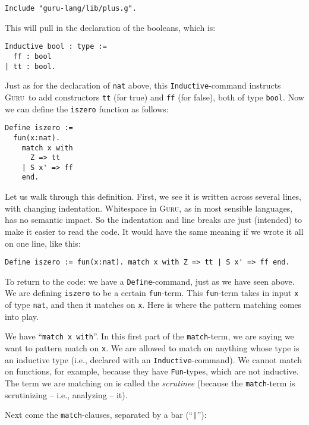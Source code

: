 \documentclass{book}[12pt]
\newcommand{\guru}[0]{\textsc{Guru}}
\begin{document}
\begin{verbatim}
Include "guru-lang/lib/plus.g".
\end{verbatim}

\noindent This will pull in the declaration of the booleans, which is:

\begin{verbatim}
Inductive bool : type :=
  ff : bool
| tt : bool.
\end{verbatim}

\noindent Just as for the declaration of \texttt{nat} above, this
\texttt{Inductive}-command instructs \guru\ to add constructors
\texttt{tt} (for true) and \texttt{ff} (for false), both of type
\texttt{bool}.  Now we can define the \texttt{iszero} function as
follows:

\begin{verbatim}
Define iszero := 
  fun(x:nat). 
    match x with 
      Z => tt 
    | S x' => ff
    end.
\end{verbatim}

\noindent Let us walk through this definition.  First, we see it is
written across several lines, with changing indentation.  Whitespace
in \guru, as in most sensible languages, has no semantic impact.  So
the indentation and line breaks are just (intended) to make it easier
to read the code.  It would have the same meaning if we wrote it all
on one line, like this:

\begin{verbatim}
Define iszero := fun(x:nat). match x with Z => tt | S x' => ff end.
\end{verbatim}

\noindent To return to the code: we have a \texttt{Define}-command,
just as we have seen above.  We are defining \texttt{iszero} to be a
certain \texttt{fun}-term.  This \texttt{fun}-term takes in input
\texttt{x} of type \texttt{nat}, and then it matches on \texttt{x}.
Here is where the pattern matching comes into play.  

We have ``\texttt{match x with}''.  In this first part of the
\texttt{match}-term, we are saying we want to pattern match on
\texttt{x}.  We are allowed to match on anything whose type is an
inductive type (i.e., declared with an \texttt{Inductive}-command).
We cannot match on functions, for example, because they have
\texttt{Fun}-types, which are not inductive.  The term we are matching
on is called the \emph{scrutinee} (because the \texttt{match}-term is
scrutinizing -- i.e., analyzing -- it).  

Next come the \texttt{match}-clauses, separated by a bar (``\texttt{|}''):
\end{document}
